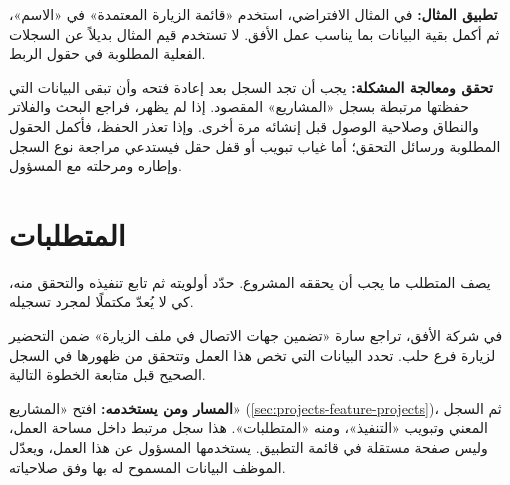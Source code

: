 \textbf{تطبيق المثال:} في المثال الافتراضي، استخدم «قائمة الزيارة المعتمدة» في «الاسم»، ثم أكمل بقية البيانات بما يناسب عمل الأفق. لا تستخدم قيم المثال بديلاً عن السجلات الفعلية المطلوبة في حقول الربط.

\textbf{تحقق ومعالجة المشكلة:} يجب أن تجد السجل بعد إعادة فتحه وأن تبقى البيانات التي حفظتها مرتبطة بسجل «المشاريع» المقصود. إذا لم يظهر، فراجع البحث والفلاتر والنطاق وصلاحية الوصول قبل إنشائه مرة أخرى. وإذا تعذر الحفظ، فأكمل الحقول المطلوبة ورسائل التحقق؛ أما غياب تبويب أو قفل حقل فيستدعي مراجعة نوع السجل وإطاره ومرحلته مع المسؤول.

\clearpage
\section{المتطلبات}
\label{sec:projects-feature-requirements}

يصف المتطلب ما يجب أن يحققه المشروع. حدّد أولويته ثم تابع تنفيذه والتحقق منه، كي لا يُعدّ مكتملًا لمجرد تسجيله.

\begin{rcnote}
في شركة الأفق، تراجع سارة «تضمين جهات الاتصال في ملف الزيارة» ضمن التحضير لزيارة فرع حلب. تحدد البيانات التي تخص هذا العمل وتتحقق من ظهورها في السجل الصحيح قبل متابعة الخطوة التالية.
\end{rcnote}

\textbf{المسار ومن يستخدمه:} افتح «المشاريع» (\ref{sec:projects-feature-projects})، ثم السجل المعني وتبويب «التنفيذ»، ومنه «المتطلبات». هذا سجل مرتبط داخل مساحة العمل، وليس صفحة مستقلة في قائمة التطبيق. يستخدمها المسؤول عن هذا العمل، ويعدّل الموظف البيانات المسموح له بها وفق صلاحياته.

